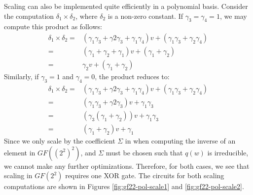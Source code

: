 Scaling can also be implemented quite efficiently in a polynomial basis. Consider the computation $\delta_1 \times \delta_2$, where $\delta_2$ is a non-zero constant. If $\gamma_3 = \gamma_4 = 1$, we may compute this product as follows:
\begin{align*}
\delta_1 \times \delta_2 = & (\gamma_1\gamma_3 + \gamma2\gamma_3 + \gamma_1\gamma_4)v + (\gamma_1\gamma_3 + \gamma_2\gamma_4) \\
= & (\gamma_1 + \gamma_2 + \gamma_1)v + (\gamma_1 + \gamma_2) \\
= & \gamma_2 v + (\gamma_1 + \gamma_2)
\end{align*}
Similarly, if $\gamma_3 = 1$ and $\gamma_4 = 0$, the product reduces to:
\begin{align*}
\delta_1 \times \delta_2 = & (\gamma_1\gamma_3 + \gamma2\gamma_3 + \gamma_1\gamma_4)v + (\gamma_1\gamma_3 + \gamma_2\gamma_4) \\
= & (\gamma_1\gamma_3 + \gamma2\gamma_3)v + \gamma_1\gamma_3 \\
= & (\gamma_3(\gamma_1 + \gamma_2))v + \gamma_1\gamma_3 \\
= & (\gamma_1 + \gamma_2)v + \gamma_1
\end{align*}
Since we only scale by the coefficient $\Sigma$ in when computing the inverse of an element in $GF((2^2)^2)$, and $\Sigma$ must be chosen such that $q(w)$ is irreducible, we cannot make any further optimizations. Therefore, for both cases, we see that scaling in $GF(2^2)$ requires one XOR gate. The circuits for both scaling computations are shown in Figures \ref{fig:gf22-pol-scale1} and \ref{fig:gf22-pol-scale2}.


